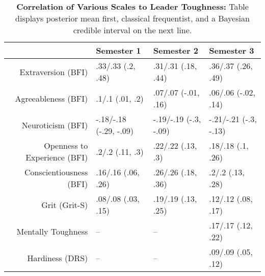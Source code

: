\begin{table}[ht]
\centering
\begin{tabular}{rlll}
  \hline
 & Semester 1 & Semester 2 & Semester 3 \\ 
  \hline
Extraversion (BFI) & .33/.33 (.2, .48) & .31/.31 (.18, .44) & .36/.37 (.26, .49) \\ 
  Agreeableness (BFI) & .1/.1 (.01, .2) & .07/.07 (-.01, .16) & .06/.06 (-.02, .14) \\ 
  Neuroticism (BFI) & -.18/-.18 (-.29, -.09) & -.19/-.19 (-.3, -.09) & -.21/-.21 (-.3, -.13) \\ 
  Openness to Experience (BFI) & .2/.2 (.11, .3) & .22/.22 (.13, .3) & .18/.18 (.1, .26) \\ 
  Conscientiousness (BFI) & .16/.16 (.06, .26) & .26/.26 (.18, .36) & .2/.2 (.13, .28) \\ 
  Grit (Grit-S) & .08/.08 (.03, .15) & .19/.19 (.13, .25) & .12/.12 (.08, .17) \\ 
  Mentally Toughness & -- & -- & .17/.17 (.12, .22) \\ 
  Hardiness (DRS) & -- & -- & .09/.09 (.05, .12) \\ 
   \hline
\end{tabular}
\caption{\textbf{Correlation of Various Scales to Leader Toughness:} Table displays posterior mean first, classical frequentist, and a Bayesian credible interval on the next line.} 
\label{tab:pers_corr}
\end{table}
